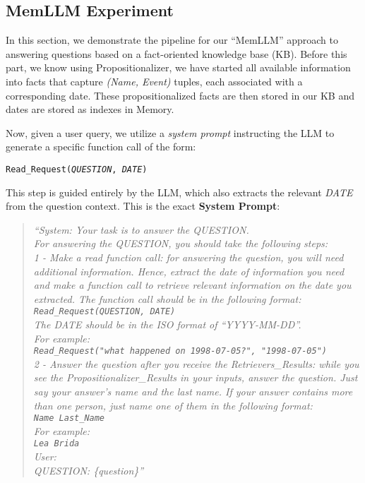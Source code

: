 \documentclass[11pt]{article}
\begin{document}
\subsection{MemLLM Experiment}
In this section, we demonstrate the pipeline for our ``MemLLM'' approach to answering questions based on a fact-oriented knowledge base (KB). Before this part, we know using Propositionalizer,  we have started all available information into facts that capture \textit{(Name, Event)} tuples, each associated with a corresponding date. These propositionalized facts are then stored in our KB and dates are stored as indexes in Memory. 

Now, given a user query, we utilize a \emph{system prompt} instructing the LLM to generate a specific function call of the form:
\begin{center}
\texttt{Read\_Request(\textit{QUESTION}, \textit{DATE})}
\end{center}
This step is guided entirely by the LLM, which also extracts the relevant \textit{DATE} from the question context. This is the exact \textbf{System Prompt}:

\begin{quote}
\emph{``System: Your task is to answer the QUESTION.\\
For answering the QUESTION, you should take the following steps:\\
1 - Make a read function call: for answering the question, you will need additional information. Hence, extract the date of information you need and make a function call to retrieve relevant information on the date you extracted. The function call should be in the following format:\\
\texttt{Read\_Request(QUESTION, DATE)}\\
The DATE should be in the ISO format of ``YYYY-MM-DD''.\\
For example:\\
\texttt{Read\_Request("what happened on 1998-07-05?", "1998-07-05")}\\
2 - Answer the question after you receive the Retrievers\_Results: while you see the Propositionalizer\_Results in your inputs, answer the question. Just say your answer's name and the last name. If your answer contains more than one person, just name one of them in the following format:\\
\texttt{Name Last\_Name}\\
For example:\\
\texttt{Lea Brida}\\
User:\\
QUESTION: \{question\}''} \\
\end{quote}
\end{document}
